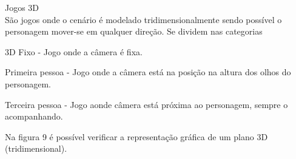 \begin{figure}[h!]
		\centering
	\end{figure}
	\pagebreak
\begin{alineascomponto}

\item Jogos 3D\\
São jogos onde o cenário é modelado tridimensionalmente sendo possível o personagem mover-se em qualquer direção.
Se dividem nas categorias
\begin{alineascomponto}
\item 3D Fixo - Jogo onde a câmera é fixa.
\item Primeira pessoa - Jogo onde a câmera está na posição na altura dos olhos do personagem.
\item Terceira pessoa - Jogo aonde câmera está próxima ao personagem, sempre o acompanhando. 
\end{alineascomponto}
Na figura 9 é possível verificar a representação gráfica de um plano 3D (tridimensional). \cite{graf}
\end{alineascomponto}

\begin{figure}[h!]
		\centering
	\end{figure}
	
